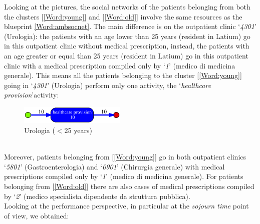 Looking at the pictures, the social networks of the patients belonging from both the clusters [\ref{Word:young}] and [\ref{Word:old}] involve the same resources as the blueprint \ref{Word:ambsocnet}. The main difference is on the outpatient clinic `\textit{4301}' (Urologia): the patients with an age lower than 25 years (resident in Latium) go in this outpatient clinic without medical prescription, instead, the patients with an age greater or equal than 25 years (resident in Latium) go in this outpatient clinic with a medical prescription compiled only by `\textit{1}' (medico di medicina generale). This means all the patients belonging to the cluster [\ref{Word:young}] going in `\textit{4301}' (Urologia) perform only one activity, the `\textit{healthcare provision}'activity:
\begin{figure} [htbp]
\includegraphics[width=0.45\textwidth]{AmbulatoriInductiveVisualMinerYoungs4301}
\caption{Urologia ($<$25 years)}
\end{figure}\\
Moreover, patients belonging from [\ref{Word:young}] go in both outpatient clinics `\textit{5801}' (Gastroenterologia) and `\textit{0901}' (Chirurgia generale) with medical prescriptions compiled only by `\textit{1}' (medico di medicina generale). For patients belonging from [\ref{Word:old}] there are also cases of medical prescriptions compiled by `\textit{2}' (medico specialista dipendente da struttura pubblica).\\
Looking at the performance perspective, in particular at the \textit{sojourn time} point of view, we obtained:

